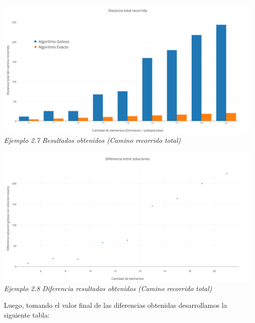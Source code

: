 \vspace*{0.3cm} \vspace*{0.3cm}
  \begin{center}
\includegraphics[scale=0.5]{./EJ2/algungym0.png}
\\{\textit{Ejemplo 2.7 Resultados obtenidos (Camino recorrido total) }}
  \end{center}
  \vspace*{0.3cm}

\vspace*{0.3cm} \vspace*{0.3cm}
  \begin{center}
\includegraphics[scale=0.5]{./EJ2/Diferenciagym0.png}
\\{\textit{Ejemplo 2.8 Diferencia resultados obtenidos (Camino recorrido total) }}
  \end{center}
  \vspace*{0.3cm}

Luego, tomando el valor final de las diferencias obtenidas desarrollamos la siguiente tabla:

